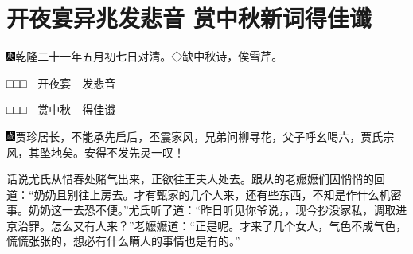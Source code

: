 
\chapter{开夜宴异兆发悲音 赏中秋新词得佳谶}
{\includegraphics[width=3mm]{../Images/00004}\kaishu 乾隆二十一年五月初七日对清。◇缺中秋诗，俟雪芹。}

{\kaishu □□□　开夜宴　发悲音}

{\kaishu □□□　赏中秋　得佳谶}

{\includegraphics[width=3mm]{../Images/00005}\kaishu 贾珍居长，不能承先启后，丕震家风，兄弟问柳寻花，父子呼幺喝六，贾氏宗风，其坠地矣。安得不发先灵一叹！}

话说尤氏从惜春处赌气出来，正欲往王夫人处去。跟从的老嬷嬷们因悄悄的回道：``奶奶且别往上房去。才有甄家的几个人来，还有些东西，不知是作什么机密事。奶奶这一去恐不便。''尤氏听了道：``昨日听见你爷说，，现今抄没家私，调取进京治罪。怎么又有人来？''老嬷嬷道：``正是呢。才来了几个女人，气色不成气色，慌慌张张的，想必有什么瞒人的事情也是有的。''

